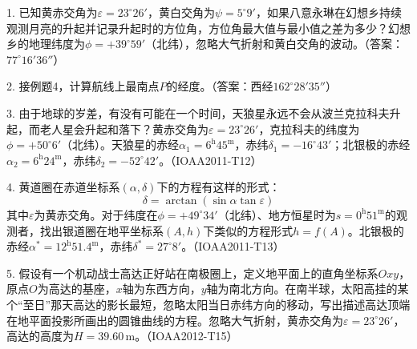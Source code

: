 \documentclass[a4paper]{article}
\renewcommand\epsilon{\varepsilon}
\begin{document}
1. 已知黄赤交角为$\epsilon=23^\circ26'$，黄白交角为$\psi=5^\circ9'$，如果八意永琳在幻想乡持续观测月亮的升起并记录升起时的方位角，方位角最大值与最小值之差为多少？幻想乡的地理纬度为$\phi = +39^\circ59'$（北纬），忽略大气折射和黄白交角的波动。（答案：$77^\circ16'36''$）
\bigskip

2. 接例题4，计算航线上最南点$P$的经度。（答案：西经$162^\circ28'35''$）
\bigskip

3. 由于地球的岁差，有没有可能在一个时间，天狼星永远不会从波兰克拉科夫升起，而老人星会升起和落下？黄赤交角为$\epsilon=23^\circ26'$，克拉科夫的纬度为$\phi = +50^\circ6'$（北纬）。天狼星的赤经$\alpha_1=\mathrm{6^h45^m}$，赤纬$\delta_1=-16^\circ43'$；北银极的赤经$\alpha_2=\mathrm{6^h24^m}$，赤纬$\delta_2=-52^\circ42'$。（IOAA2011-T12）
\bigskip

4. 黄道圈在赤道坐标系$(\alpha,\delta)$下的方程有这样的形式：
\[
    \delta = \arctan(\sin\alpha\tan\epsilon)
\]
其中$\epsilon$为黄赤交角。对于纬度在$\phi = +49^\circ34'$（北纬）、地方恒星时为$s = \mathrm{0^h51^m}$的观测者，找出银道圈在地平坐标系$(A,h)$下类似的方程形式$h = f(A)$。北银极的赤经$\alpha^*=\mathrm{12^h51.4^m}$，赤纬$\delta^*=27^\circ8'$。（IOAA2011-T13）
\bigskip

5. 假设有一个机动战士高达正好站在南极圈上，定义地平面上的直角坐标系$Oxy$，原点$O$为高达的基座，$x$轴为东西方向，$y$轴为南北方向。在南半球，太阳高挂的某个“至日”那天高达的影长最短，忽略太阳当日赤纬方向的移动，写出描述高达顶端在地平面投影所画出的圆锥曲线的方程。忽略大气折射，黄赤交角为$\epsilon=23^\circ26'$，高达的高度为$H=39.60\,\mathrm{m}$。（IOAA2012-T15）
\bigskip
\end{document}

